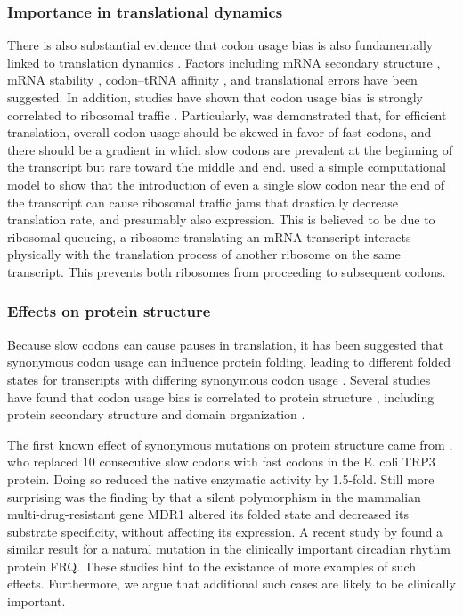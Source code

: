 \documentclass[11pt]{nih}
\begin{document}
\subsubsection{Importance in translational dynamics}
There is also substantial evidence that codon usage bias is also fundamentally linked to translation dynamics  \citep{Bentele2013,Mitarai2013,Cannarozzi2010,Fredrick2010,Marin2008,Buchan2007}. Factors including mRNA secondary structure \citep{Stoletzki2008,Chamary2005,Baim1985}, mRNA stability \citep{Gu2010}, codon--tRNA affinity \cite{Klumpp2012}, and translational errors \cite{Zhou2009,Drummond2008,Najafabadi2007} have been suggested. In addition, studies have shown that codon usage bias is strongly correlated to ribosomal traffic \citep{Cannarozzi2010a,Buchan2007,Komar1999}.  Particularly, was demonstrated that, for efficient translation, overall codon usage should be skewed in favor of fast codons, and there should be a gradient in which slow codons are prevalent at the beginning of the transcript but rare toward the middle and end. \citet{Mitarai2013} used a simple computational model to show that the introduction of even a single slow codon near the end of the transcript can cause ribosomal traffic jams that drastically decrease translation rate, and presumably also expression. This is believed to be due to ribosomal queueing, a ribosome translating an mRNA transcript interacts physically with the translation process of another ribosome on the same transcript. This prevents both ribosomes from proceeding to subsequent codons.

\subsubsection{Effects on protein structure}
Because slow codons can cause pauses in translation, it has been suggested that synonymous codon usage can influence protein folding, leading to different folded states for transcripts with differing synonymous codon usage \cite{Komar2009,Zhang2009,Buchan2007,Crombie1994}.
Several studies have found that codon usage bias is correlated to protein structure \citep{Saunders2010,Biro2006,Adzhubei1996,Gu2003}, including protein secondary structure \citep{Oresic2003,Gu2003,Thanaraj1996a} and domain organization \citep{Gu2004,Oresic2003}.

The first known effect of synonymous mutations on protein structure came from \citet{Crombie1994}, who replaced 10 consecutive slow codons with fast codons in the E. coli TRP3 protein. Doing so reduced the native enzymatic activity by 1.5-fold. Still more surprising was the finding by \citet{Sarfaty2007} that a silent polymorphism in the mammalian multi-drug-resistant gene MDR1 altered its folded state and decreased its substrate specificity, without affecting its expression. A recent study by \citet{Zhou2013} found a similar result for a natural mutation in the clinically important circadian rhythm protein FRQ. These studies hint to the existance of more examples of such effects. Furthermore, we argue that additional such cases are likely to be clinically important. 
\end{document}
